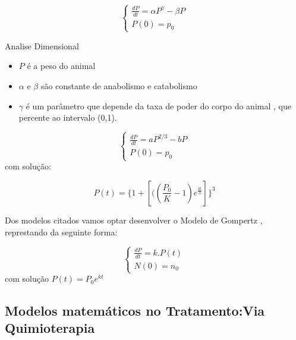  \begin{equation*}
\begin{cases}
  \frac{dP}{dt} =\alpha P^{\gamma}- 
   \beta P\\
   P(0)=p_0  
\end{cases}
\end{equation*}

Analise Dimensional

\begin{itemize}
    \item $P$ é a peso do animal
    \item $\alpha$ e $\beta$ são constante de anabolismo e catabolismo 
    \item $\gamma$ é um parâmetro que depende da taxa de poder do corpo do animal , que percente ao intervalo (0,1).
\end{itemize}

    \begin{equation}
\begin{cases}
  \frac{dP}{dt} =aP^{2/3}- 
   bP\\
   P(0)=p_0  
\end{cases}
\end{equation}
com solução:

\begin{equation*}
    P(t)=\{1+[((\frac{P_0}{K}
    -1)e^{\frac{bt}{3}}]\}^3
\end{equation*}

Dos modelos citados vamos optar desenvolver o Modelo de Gompertz , represtando da seguinte forma:

     \begin{equation}
\begin{cases}
  \frac{dP}{dt} =k.P(t)\\
   N(0)=n_0  
\end{cases}
\end{equation}
com solução $P(t)=P_0e^{kt}$

\newpage
\subsection{Modelos matemáticos no Tratamento:Via Quimioterapia}

